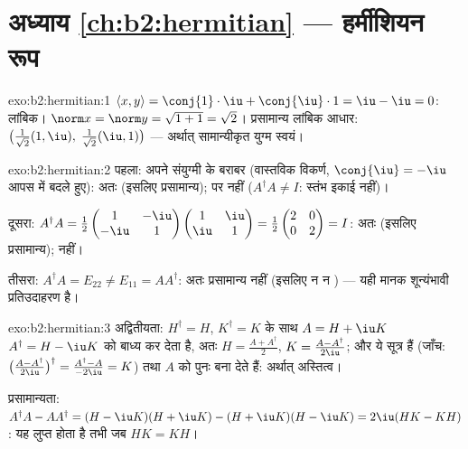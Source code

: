 \section*{अध्याय \ref{ch:b2:hermitian} --- हर्मीशियन रूप}

\begin{solution}{exo:b2:hermitian:1}
$\langle x, y\rangle = \conj{1}\cdot\iu + \conj{\iu}\cdot 1 = \iu -
\iu = 0$: लांबिक। $\norm x = \norm y = \sqrt{1 + 1} = \sqrt2$। प्रसामान्य लांबिक आधार: $\bigl(\frac{1}{\sqrt2}(1, \iu),\;
\frac{1}{\sqrt2}(\iu, 1)\bigr)$ --- अर्थात् सामान्यीकृत
युग्म स्वयं।
\end{solution}

\begin{solution}{exo:b2:hermitian:2}
पहला: अपने संयुग्मी  के बराबर (वास्तविक विकर्ण, $\conj{\iu} =
-\iu$ आपस में बदले
हुए): अतः  (इसलिए प्रसामान्य); पर  नहीं ($A^\dagger A
\neq I$: स्तंभ इकाई
नहीं)।

दूसरा: $A^\dagger A = \frac12\begin{pmatrix} 1 & -\iu\\ -\iu &
1\end{pmatrix}\begin{pmatrix} 1 & \iu\\ \iu & 1\end{pmatrix} =
\frac12\begin{pmatrix} 2 & 0\\ 0 & 2\end{pmatrix} = I$: अतः  (इसलिए प्रसामान्य);  नहीं।

तीसरा: $A^\dagger A = E_{22} \neq E_{11} = AA^\dagger$: अतः प्रसामान्य नहीं (इसलिए न  न ) --- यही
मानक शून्यंभावी प्रतिउदाहरण है।
\end{solution}

\begin{solution}{exo:b2:hermitian:3}
अद्वितीयता: $H^\dagger = H$, $K^\dagger = K$ के साथ $A = H + \iu K$ $A^\dagger = H - \iu K$ को बाध्य कर देता है, अतः $H = \frac{A + A^\dagger}{2}$, $K = \frac{A - A^\dagger}{2\iu}$;
और ये सूत्र  हैं (जाँच: $\bigl(\frac{A - A^\dagger}{2\iu}\bigr)^\dagger = \frac{
A^\dagger - A}{-2\iu} = K$) तथा $A$ को पुनः बना देते हैं:
अर्थात् अस्तित्व।

प्रसामान्यता: $A^\dagger A - AA^\dagger = (H - \iu K)(H + \iu K) - (H
+ \iu K)(H - \iu K) = 2\iu(HK - KH)$: यह लुप्त होता है तभी जब $HK = KH$।
\end{solution}

